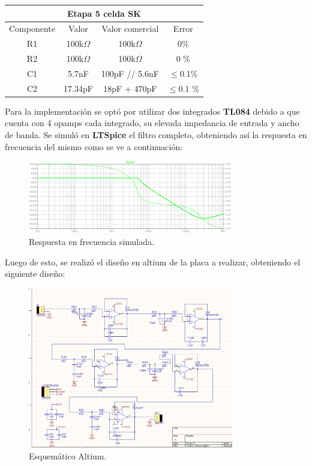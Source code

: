 \begin{table}[H]
\centering
\begin{tabular}{cccc}
\hline
\multicolumn{4}{|c|}{\textbf{Etapa 5 celda SK}} \\ \hline
Componente & Valor & Valor comercial & Error \\ \hline
R1 & 100k$\Omega$ & 100k$\Omega$ & 0$\%$ \\
R2 & 100k$\Omega$ & 100k$\Omega$ & 0 $\%$\\
C1 & 5.7nF & 100pF // 5.6nF & $\le$0.1$\%$ \\
C2 & 17.34pF & 18pF + 470pF & $\le$0.1 $\%$
\end{tabular}
\end{table}


Para la implementación se optó por utilizar dos integrados \textbf{TL084} debido a que cuenta con 4 opamps cada integrado, su elevada impedancia de entrada y ancho de banda. Se simuló en \textbf{LTSpice} el filtro completo, obteniendo así la respuesta en frecuencia del mismo como se ve a continuación:
 \begin{figure}[H]
	\centering
	\includegraphics[width=0.8\textwidth]{ImagenesEjercicio2/spice.PNG}
\caption{Respuesta en frecuencia simulada.}
	\label{fig:transspice}
\end{figure}
Luego de esto, se realizó el diseño en altium de la placa a realizar, obteniendo el siguiente diseño:
 \begin{figure}[H]
	\centering
	\includegraphics[width=0.8\textwidth]{ImagenesEjercicio2/altiumesq.PNG}
\caption{Esquemático Altium.}
	\label{fig:altiumesq}
\end{figure}

